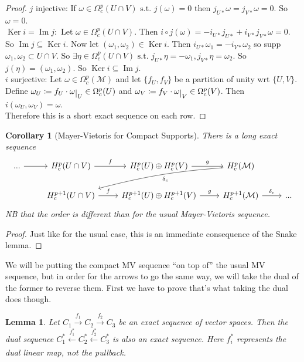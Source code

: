 \documentclass[10pt]{article}
\theoremstyle{plain}
\newtheorem{corollary}[thm]{Corollary}
\newtheorem{lemma}[thm]{Lemma}
\theoremstyle{definition}
\newcommand{\st}{\text{ s.t. }}
\newcommand{\man}{\mathcal{M}}
\def\restrict#1{\raise-.5ex\hbox{\ensuremath|}_{#1}}
\DeclareMathOperator{\Ker}{Ker}
\DeclareMathOperator{\Ima}{Im}
\newcommand{\UintV}{U\cap V}
\begin{document}
\begin{proof}
$j$ injective: If $\omega \in \Omega^p_c(U\cap V) \st j(\omega) = 0 $ then $ j_{U*} \omega = j_{V*} \omega= 0 $. So $\omega = 0$.\\
$\Ker i = \Ima j:$ Let $\omega \in \Omega^p_c(U\cap V)$. Then $i \circ j (\omega) = - i_{U*} j_{U*} + i_{V*} j_{V*} \omega = 0$. So $\Ima j \subseteq \Ker i$. Now let $(\omega_1,\omega_2) \in \Ker i$. Then $i_{U*} \omega_1 = -i_{V*} \omega_2$ so supp $\omega_1,\omega_2 \subset U\cap V$. So $\exists \eta \in \Omega_c^p(U\cap V) \st j_{U*}\eta = -\omega_1, j_{V*} \eta = \omega_2$. So $j(\eta) = (\omega_1,\omega_2).$ So $\Ker i \subseteq \Ima j$. \\
$i$ surjective: Let $\omega \in \Omega_c^p(\man)$ and let $\{f_U,f_V\}$ be a partition of unity wrt $\{U,V\}$. Define $\omega_U \coloneqq f_U \cdot \omega\restrict{U} \in \Omega_c^p(U)$ and $\omega_V \coloneqq f_V \cdot \omega\restrict{V} \in \Omega_c^p(V)$. Then $i(\omega_U,\omega_V) = \omega$.\\
Therefore this is a short exact sequence on each row.
\end{proof}
\begin{corollary}[Mayer-Vietoris for Compact Supports]\label{cor:CompactMVT}
There is a long exact sequence
$$\begin{tikzcd}
... \arrow[r] & H_c^p(\UintV) \arrow[r, "f"]     & H_c^p(U)\oplus H_c^p(V) \arrow[r, "g"]         & H_c^p(\mathcal{M}) \arrow[lld, "\delta_c",bend right = 5] &     \\
              & H_c^{p+1}(\UintV) \arrow[r, "f"] & H_c^{p+1}(U)\oplus H_c^{p+1}(V) \arrow[r, "g"] & H_c^{p+1}(\mathcal{M}) \arrow[r, "\delta_c"]                          & ...
\end{tikzcd}$$
NB that the order is different than for the usual Mayer-Vietoris sequence.
\end{corollary}
\begin{proof}
Just like for the usual case, this is an immediate consequence of the Snake lemma.
\end{proof}
We will be putting the compact MV sequence ``on top of'' the usual MV sequence, but in order for the arrows to go the same way, we will take the dual of the former to reverse them. First we have to prove that's what taking the dual does though.
\begin{lemma}
Let $C_1 \xrightarrow{f_1} C_2 \xrightarrow{f_2} C_3$ be an exact sequence of vector spaces. Then the dual sequence $C_1^* \xleftarrow[]{f_1^*} C_2^* \xleftarrow[]{f_2^*} C_3^*$ is also an exact sequence. Here $f_i^*$ represents the dual linear map, not the pullback.
\end{lemma}
\end{document}
